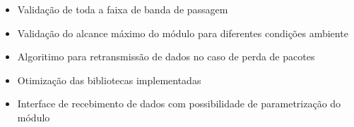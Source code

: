 \documentclass[
	12pt,				%
	openright,			%
	twoside,			%
	a4paper,			%
	english,			%
	french,				%
	spanish,			%
	brazil,				%
	]{abntex2}
\begin{document}
	\begin{itemize}
		\item Validação de toda a faixa de banda de passagem
		\item Validação do alcance máximo do módulo para diferentes condições ambiente
		\item Algoritimo para retransmissão de dados no caso de perda de pacotes
		\item Otimização das bibliotecas implementadas
		\item Interface de recebimento de dados com possibilidade de parametrização do módulo
	\end{itemize}


% 

\postextual

% 


\end{document}
